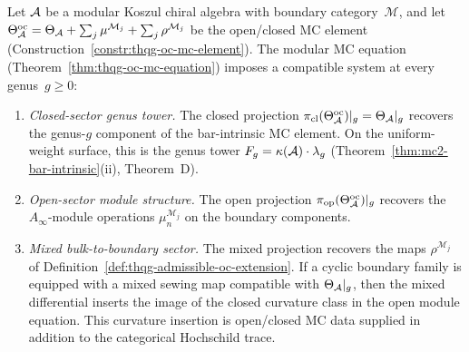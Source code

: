 \begin{theorem}
\label{thm:thqg-mc-forced-consistency}
Let $\mathcal{A}$ be a modular Koszul chiral algebra with boundary
category~$\mathcal{M}$, and let $\Theta^{\mathrm{oc}}_{\mathcal{A}}
= \Theta_{\mathcal{A}} + \sum_j \mu^{\mathcal{M}_j}
 + \sum_j \rho^{\mathcal{M}_j}$
be the open/closed MC element
\textup{(}Construction~\textup{\ref{constr:thqg-oc-mc-element})}.
The modular MC equation
\textup{(}Theorem~\textup{\ref{thm:thqg-oc-mc-equation})}
imposes a compatible system at every genus~$g \geq 0$:
\begin{enumerate}[label=\textup{(\alph*)}]
\item \emph{Closed-sector genus tower.}
 The closed projection
 $\pi_{\mathrm{cl}}(\Theta^{\mathrm{oc}}_{\mathcal{A}})|_{g}
 = \Theta_{\mathcal{A}}|_{g}$
 recovers the genus-$g$ component of the bar-intrinsic MC element.
On the uniform-weight surface, this is the genus tower
$F_g = \kappa(\mathcal{A}) \cdot \lambda_g$
\textup{(}Theorem~\textup{\ref{thm:mc2-bar-intrinsic}}(ii),
 Theorem~D\textup{)}.

\item \emph{Open-sector module structure.}
 The open projection
 $\pi_{\mathrm{op}}(\Theta^{\mathrm{oc}}_{\mathcal{A}})|_{g}$
 recovers the $A_\infty$-module operations
 $\mu^{\mathcal{M}_j}_{n}$ on the boundary components.

\item \emph{Mixed bulk-to-boundary sector.}
 The mixed projection recovers the maps
 $\rho^{\mathcal{M}_j}$ of
 Definition~\ref{def:thqg-admissible-oc-extension}. If a cyclic
 boundary family is equipped with a mixed sewing map compatible with
 $\Theta_{\mathcal{A}}|_g$, then the mixed differential inserts the image of
 the closed curvature class in the open module equation. This
 curvature insertion is open/closed MC data supplied in addition to
 the categorical Hochschild trace.


\end{enumerate}
\end{theorem}
